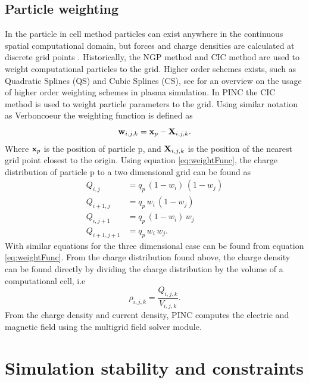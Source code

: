 \subsection{Particle weighting}
In the particle in cell method particles can exist anywhere in the continuous spatial computational domain, but forces and charge densities are calculated at discrete grid points \parencite[chapter 2.6]{Birdsall2004}. Historically, the NGP method and CIC method are used to weight computational particles to the grid. Higher order schemes exists, such as Quadratic Splines (QS) and Cubic Splines (CS), see \parencite{Okuda1979} for an overview on the usage of higher order weighting schemes in plasma simulation. In PINC the CIC method is used to weight particle parameters to the grid. Using similar notation as Verboncoeur \parencite{Verboncoeur2005} the weighting function is defined as 
\begin{equation}\label{eq:weightFunc}
    \vb{w}_{i,j,k} = \vb{x}_p - \vb{X}_{i,j,k}.
\end{equation}
Where $\vb{x}_p$ is the position of particle p, and $\vb{X}_{i,j,k}$ is the position of the nearest grid point closest to the origin. Using equation \eqref{eq:weightFunc}, the charge distribution of particle p to a two dimensional grid can be found as
\begin{subequations}
    \begin{align*}
        Q_{i,j} &= q_p \, (1 - w_i) \, (1 - w_j) \\
        Q_{i+1,j} &= q_p \, w_i \, (1 - w_j) \\
        Q_{i,j+1} &= q_p \, (1 - w_i) \, w_j \\
        Q_{i+1,j+1} &= q_p \, w_i \, w_j. 
    \end{align*}
\end{subequations}
With similar equations for the three dimensional case can be found from equation \eqref{eq:weightFunc}. From the charge distribution found above, the charge density can be found directly by dividing the charge distribution by the volume of a computational cell, i.e 
\begin{equation*}
    \rho_{i,j,k} = \frac{Q_{i,j,k}}{V_{i,j,k}}.
\end{equation*}
From the charge density and current density, PINC computes the electric and magnetic field using the multigrid field solver module.

\section{Simulation stability and constraints}

